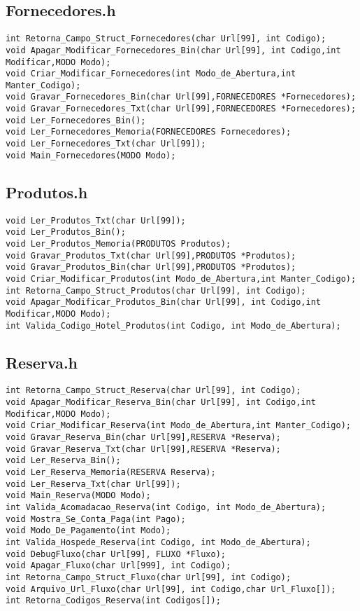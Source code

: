 \documentclass{article}
\begin{document}
\subsection{Fornecedores.h}
\begin{lstlisting}
int Retorna_Campo_Struct_Fornecedores(char Url[99], int Codigo);
void Apagar_Modificar_Fornecedores_Bin(char Url[99], int Codigo,int Modificar,MODO Modo);
void Criar_Modificar_Fornecedores(int Modo_de_Abertura,int Manter_Codigo);
void Gravar_Fornecedores_Bin(char Url[99],FORNECEDORES *Fornecedores);
void Gravar_Fornecedores_Txt(char Url[99],FORNECEDORES *Fornecedores);
void Ler_Fornecedores_Bin();
void Ler_Fornecedores_Memoria(FORNECEDORES Fornecedores);
void Ler_Fornecedores_Txt(char Url[99]);
void Main_Fornecedores(MODO Modo);
\end{lstlisting}

\subsection{Produtos.h}
\begin{lstlisting}
void Ler_Produtos_Txt(char Url[99]);
void Ler_Produtos_Bin();
void Ler_Produtos_Memoria(PRODUTOS Produtos);
void Gravar_Produtos_Txt(char Url[99],PRODUTOS *Produtos);
void Gravar_Produtos_Bin(char Url[99],PRODUTOS *Produtos);
void Criar_Modificar_Produtos(int Modo_de_Abertura,int Manter_Codigo);
int Retorna_Campo_Struct_Produtos(char Url[99], int Codigo);
void Apagar_Modificar_Produtos_Bin(char Url[99], int Codigo,int Modificar,MODO Modo);
int Valida_Codigo_Hotel_Produtos(int Codigo, int Modo_de_Abertura);
\end{lstlisting}

\subsection{Reserva.h}
\begin{lstlisting}
int Retorna_Campo_Struct_Reserva(char Url[99], int Codigo);
void Apagar_Modificar_Reserva_Bin(char Url[99], int Codigo,int Modificar,MODO Modo);
void Criar_Modificar_Reserva(int Modo_de_Abertura,int Manter_Codigo);
void Gravar_Reserva_Bin(char Url[99],RESERVA *Reserva);
void Gravar_Reserva_Txt(char Url[99],RESERVA *Reserva);
void Ler_Reserva_Bin();
void Ler_Reserva_Memoria(RESERVA Reserva);
void Ler_Reserva_Txt(char Url[99]);
void Main_Reserva(MODO Modo);
int Valida_Acomadacao_Reserva(int Codigo, int Modo_de_Abertura);
void Mostra_Se_Conta_Paga(int Pago);
void Modo_De_Pagamento(int Modo);
int Valida_Hospede_Reserva(int Codigo, int Modo_de_Abertura);
void DebugFluxo(char Url[99], FLUXO *Fluxo);
void Apagar_Fluxo(char Url[999], int Codigo);
int Retorna_Campo_Struct_Fluxo(char Url[99], int Codigo);
void Arquivo_Url_Fluxo(char Url[99], int Codigo,char Url_Fluxo[]);
int Retorna_Codigos_Reserva(int Codigos[]);
\end{lstlisting}
\end{document}
